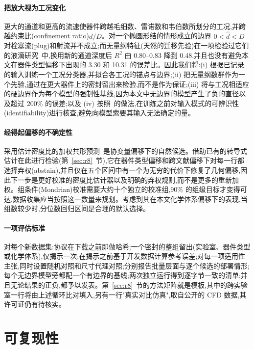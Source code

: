 \documentclass[11pt,a4paper]{ctexart}
\begin{document}
\paragraph{把放大视为工况变化} 更大的通道和更高的流速使器件跨越毛细数、雷诺数和韦伯数所划分的工况,并跨越约束比(confinement ratio)$d/D$。对一个椭圆形结的情形成立的边界 $0<\hat d<D$ 对栓塞流(plug)和射流并不成立;而无量纲特征(天然的迁移先验)在一项检验过它们的液滴研究~\cite{labchip2025dimless}中,换用新的通道深度后 $R^2$ 由 0.80–0.83 降到 0.48,并且也没有避免本文在器件类型偏移下出现的 3.30 和 10.31 的误差比。因此我们将:(i) 根据已记录的输入训练一个工况分类器,并拟合各工况的锚点与边界;(ii) 把无量纲数群作为一个先验,通过在更大器件上的密封留出来检验,而不是作为保证;(iii) 将与工况相适应的硬边界作为每个模型的强制性基线,因为本文中无边界的模型产生了负的直径以及超过 200\% 的误差;以及 (iv) 按照~\cite{cieslak2026}的做法,在训练之前对输入模式的可辨识性(identifiability)进行核查,避免向模型索要其输入无法确定的量。

\paragraph{经得起偏移的不确定性} 采用估计密度比的加权共形预测~\cite{tibshirani2019}是协变量偏移下的自然候选。借助已有的转导式估计在此进行检验(第~\ref{sec:r8}~节),它在器件类型偏移和跨文献偏移下对每一行都选择弃权(abstain),并且仅在五个区间中有一个为无穷的代价下修复了几何偏移,因此下一步是更好校准的密度比估计器以及明确的弃权规则,而不是更多的重新加权。组条件(Mondrian)校准需要大约十个独立的校准组,90\% 的组级目标才变得可达,数据收集应当按照这一数量来规划。考虑到其在本文化学体系偏移下的表现,当组数较少时,分位数回归区间是合理的默认选择。

\paragraph{一项评估标准} 对每个新数据集:协议在下载之前即做哈希;一个密封的整组留出(实验室、器件类型或化学体系),仅揭示一次;在揭示之前基于开发数据计算参考误差;对每一项适用性主张,同时设置随机对照和尺寸代理对照;分别报告批量层面与逐个候选的部署情形;每个无边界模型旁都配一个有边界的基线;两次独立运行得到逐字节一致的清单;并且无论结果的正负,都予以发表。第~\ref{sec:r8}~节的方法矩阵就是模板,其中的跨实验室一行将由上述循环比对填入,另有一行"真实对比仿真",取自公开的 CFD 数据,其许可证仍有待核实。

\section{可复现性}
\label{sec:repro}
\end{document}
